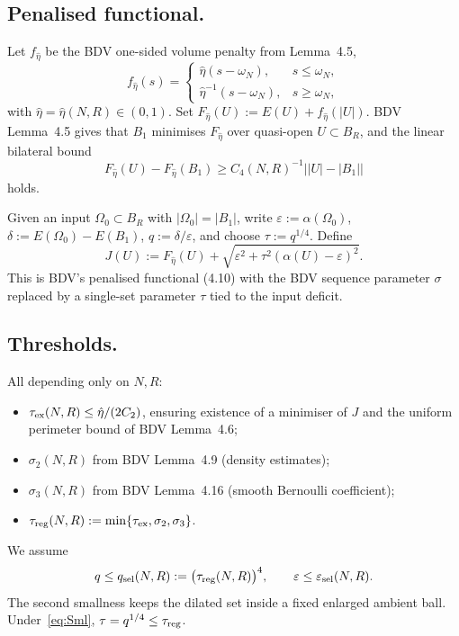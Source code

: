 \documentclass[11pt]{article}
\theoremstyle{definition}
\newcommand{\eps}{\varepsilon}
\newcommand{\Om}{\Omega}
\begin{document}
\subsection*{Penalised functional.}
Let $f_{\hat\eta}$ be the BDV one-sided volume penalty from Lemma~4.5,
\[
f_{\hat\eta}(s)=
\begin{cases}
\hat\eta(s-\omega_N),&s\le\omega_N,\\
\hat\eta^{-1}(s-\omega_N),&s\ge\omega_N,
\end{cases}
\]
with $\hat\eta=\hat\eta(N,R)\in(0,1)$. Set
$F_{\hat\eta}(U):=E(U)+f_{\hat\eta}(|U|)$. BDV Lemma~4.5 gives that $B_1$
minimises $F_{\hat\eta}$ over quasi-open $U\subset B_R$, and the linear
bilateral bound
\begin{equation}\label{eq:Lem45}
F_{\hat\eta}(U)-F_{\hat\eta}(B_1)\ge C_4(N,R)^{-1}\bigl||U|-|B_1|\bigr|
\end{equation}
holds.

Given an input $\Om_0\subset B_R$ with $|\Om_0|=|B_1|$, write
$\eps:=\alpha(\Om_0)$, $\delta:=E(\Om_0)-E(B_1)$, $q:=\delta/\eps$, and
choose $\tau:=q^{1/4}$. Define
\begin{equation}\label{eq:Jdef}
J(U):=F_{\hat\eta}(U)
+\sqrt{\eps^2+\tau^2(\alpha(U)-\eps)^2}.
\end{equation}
This is BDV's penalised functional (4.10) with the BDV sequence parameter
$\sigma$ replaced by a single-set parameter $\tau$ tied to the input
deficit.

\subsection*{Thresholds.}
All depending only on $N,R$:
\begin{itemize}
\item $\tau_{\rm ex}(N,R)\le\hat\eta/(2C_2)$, ensuring existence of a
minimiser of $J$ and the uniform perimeter bound of BDV Lemma~4.6;
\item $\sigma_2(N,R)$ from BDV Lemma~4.9 (density estimates);
\item $\sigma_3(N,R)$ from BDV Lemma~4.16 (smooth Bernoulli coefficient);
\item $\tau_{\rm reg}(N,R):=\min\{\tau_{\rm ex},\sigma_2,\sigma_3\}$.
\end{itemize}
We assume
\begin{equation}\label{eq:Sml}
q\le q_{\rm sel}(N,R):=\bigl(\tau_{\rm reg}(N,R)\bigr)^{4},\qquad
\eps\le\eps_{\rm sel}(N,R).
\end{equation}
The second smallness keeps the dilated set inside a fixed enlarged ambient
ball. Under~\eqref{eq:Sml}, $\tau=q^{1/4}\le\tau_{\rm reg}$.
\end{document}

